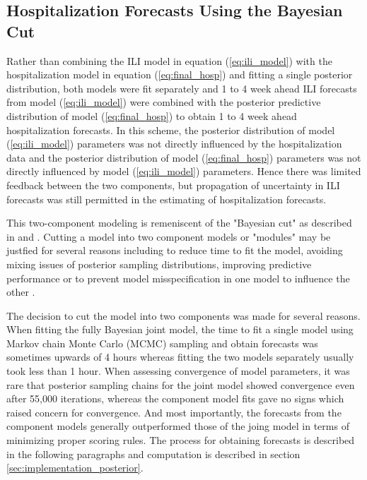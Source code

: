\subsection{Hospitalization Forecasts Using the Bayesian Cut}

Rather than combining the ILI model in equation (\ref{eq:ili_model}) with the 
hospitalization model in equation (\ref{eq:final_hosp}) and fitting a single
posterior distribution, both models were fit separately and 1 to 4 week ahead
ILI forecasts from model (\ref{eq:ili_model}) were combined with the posterior
predictive distribution of model (\ref{eq:final_hosp}) to obtain 1 to 4 week
ahead hospitalization forecasts. In this scheme, the posterior distribution of 
model (\ref{eq:ili_model}) parameters was not directly influenced by the 
hospitalization data and the posterior distribution of model 
(\ref{eq:final_hosp}) parameters was not directly influenced by model 
(\ref{eq:ili_model}) parameters. Hence there was limited feedback between the
two components, but propagation of uncertainty in ILI forecasts was still 
permitted in the estimating of hospitalization forecasts.

This two-component modeling is remeniscent of the "Bayesian cut" as 
described in \cite{plummer2015cuts} and \cite{nott2023bayesian}. Cutting a model
into two component models or "modules" may be justfied for several reasons
including to reduce time to fit the model, avoiding mixing issues of posterior
sampling distributions, improving predictive performance or to prevent
model misspecification in one model to influence the other 
\cite[]{nott2023bayesian, jacob2020unbiased, jacob2017better, plummer2015cuts}.

The decision to cut the model into two components was made for several reasons.
When fitting the fully Bayesian joint model, the time to fit a single model using
Markov chain Monte Carlo (MCMC) sampling and
obtain forecasts was sometimes upwards of 4 hours whereas fitting the two models
separately usually took less than 1 hour. When assessing convergence of model
parameters, it was rare that posterior sampling chains for the joint model
showed convergence even after 55,000 iterations, whereas the component model 
fits gave no signs which raised concern for convergence. And most importantly,
the forecasts from the component models generally outperformed those of the 
joing model in terms of minimizing proper scoring rules. 
The process for obtaining forecasts is described in the following paragraphs 
and computation is described in section \ref{sec:implementation_posterior}.


